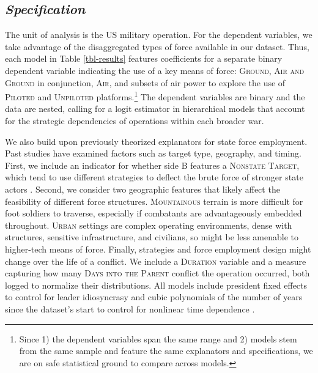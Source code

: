 \documentclass[fleqn,12pt]{article}
\begin{document}
\subsection*{\textit{Specification}}
The unit of analysis is the US military operation. For the dependent variables, we take advantage of the disaggregated types of force available in our dataset. Thus, each model in Table \ref{tbl-results} features coefficients for a separate binary dependent variable indicating the use of a key means of force: \textsc{Ground}, \textsc{Air and Ground} in conjunction, \textsc{Air}, and subsets of air power to explore the use of \textsc{Piloted} and \textsc{Unpiloted} platforms.\footnote{Since 1) the dependent variables span the same range and 2) models stem from the same sample and feature the same explanators and specifications, we are on safe statistical ground to compare across models.} The dependent variables are binary and the data are nested, calling for a logit estimator in hierarchical models that account for the strategic dependencies of operations within each broader war.

We also build upon previously theorized explanators for state force employment. Past studies have examined factors such as target type, geography, and timing. First, we include an indicator for whether side B features a \textsc{Nonstate Target}, which tend to use different strategies to deflect the brute force of stronger state actors \citep{arreguin-toft_howweakwin_2001}. Second, we consider two geographic features that likely affect the feasibility of different force structures. \textsc{Mountainous} terrain is more difficult for foot soldiers to traverse, especially if combatants are advantageously embedded throughout. \textsc{Urban} settings are complex operating environments, dense with structures, sensitive infrastructure, and civilians, so might be less amenable to higher-tech means of force. Finally, strategies and force employment design might change over the life of a conflict. We include a \textsc{Duration} variable and a measure capturing how many \textsc{Days into the Parent} conflict the operation occurred, both logged to normalize their distributions. All models include president fixed effects to control for leader idiosyncrasy and cubic polynomials of the number of years since the dataset's start to control for nonlinear time dependence \citep{carter_backfuturemodeling_2010}.
\end{document}
